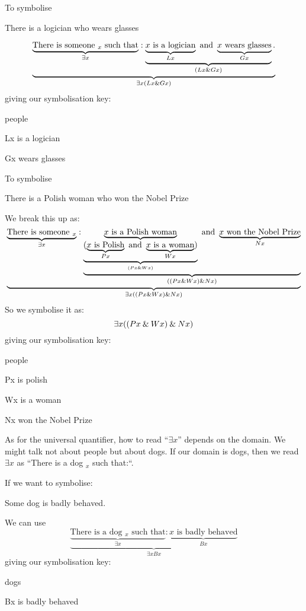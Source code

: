 To symbolise 
\begin{earg}
\item[\ex{q.e}] There is a logician who wears glasses
\end{earg}
$$\underbrace{\underbrace{\text{There is someone $_x$ such that}}_{\exists x}: \underbrace{\underbrace{\text{$x$ is a logician}}_{Lx}\text{ and }\underbrace{\text{$x$ wears glasses}}_{Gx}}_{(Lx\mathbin{\&} Gx)}.}_{\exists x(Lx\mathbin{\&} Gx)}$$
giving our symbolisation key:
\begin{ekey}
\item[\text{domain}] people
\item[Lx] is a logician
\item[Gx] wears glasses
\end{ekey}

To symbolise 
\begin{earg}
\item[\ex{q.e}] There is a Polish woman who won the Nobel Prize
\end{earg}
We break this up as:
$$
\underbrace{	
	\underbrace{\text{There is someone $_x$}}_{\exists x}:
	\underbrace{
		\underbrace{\text{$x$ is a Polish woman}}_{
			\underbrace{(\underbrace{\text{$x$ is Polish}}_{Px}
			\text{ and }
			\underbrace{\text{$x$ is a woman}}_{Wx}
			)}_{(Px\mathbin{\&} Wx)}
			}
		\text{ and }
		\underbrace{\text{$x$ won the Nobel Prize}}_{Nx}
	}_{((Px\mathbin{\&} Wx)\mathbin{\&} Nx)}
}_{\exists x((Px\mathbin{\&} Wx)\mathbin{\&} Nx)}
$$
So we symbolise it as:
$$\exists x((Px\mathbin{\&} Wx)\mathbin{\&} Nx)$$
giving our symbolisation key:
\begin{ekey}
\item[\text{domain}] people
\item[Px] is polish
\item[Wx] is a woman
\item[Nx] won the Nobel Prize
\end{ekey}


As for the universal quantifier, how to read ``$\exists x$'' depends on the domain. We might talk not about people but about dogs. If our domain is dogs, then we read $\exists x$ as ``There is a dog $_x$ such that:``. 

If we want to symbolise:
\begin{earg}
\item[\ex{q.dog}] Some dog is badly behaved.
\end{earg}
We can use
$$\underbrace{\underbrace{\text{There is a dog $_x$ such that}}_{\exists x}: \underbrace{\text{$x$ is badly behaved}}_{Bx}}_{\exists xBx}$$
giving our symbolisation key:
\begin{ekey}
\item[\text{domain}] dogs
\item[Bx] is badly behaved
\end{ekey}

